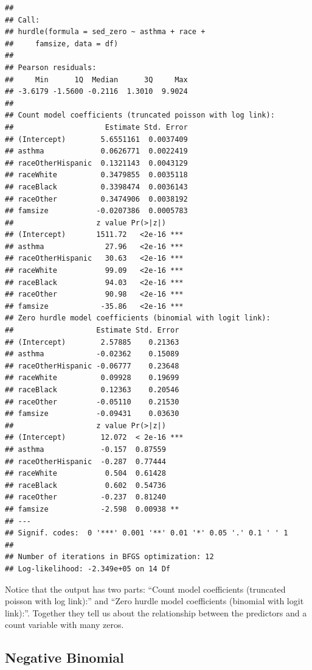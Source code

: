 \documentclass[]{tufte-book}
\theoremstyle{definition}
\theoremstyle{definition}
\theoremstyle{remark}
\begin{document}
\begin{verbatim}
## 
## Call:
## hurdle(formula = sed_zero ~ asthma + race + 
##     famsize, data = df)
## 
## Pearson residuals:
##     Min      1Q  Median      3Q     Max 
## -3.6179 -1.5600 -0.2116  1.3010  9.9024 
## 
## Count model coefficients (truncated poisson with log link):
##                     Estimate Std. Error
## (Intercept)        5.6551161  0.0037409
## asthma             0.0626771  0.0022419
## raceOtherHispanic  0.1321143  0.0043129
## raceWhite          0.3479855  0.0035118
## raceBlack          0.3398474  0.0036143
## raceOther          0.3474906  0.0038192
## famsize           -0.0207386  0.0005783
##                   z value Pr(>|z|)    
## (Intercept)       1511.72   <2e-16 ***
## asthma              27.96   <2e-16 ***
## raceOtherHispanic   30.63   <2e-16 ***
## raceWhite           99.09   <2e-16 ***
## raceBlack           94.03   <2e-16 ***
## raceOther           90.98   <2e-16 ***
## famsize            -35.86   <2e-16 ***
## Zero hurdle model coefficients (binomial with logit link):
##                   Estimate Std. Error
## (Intercept)        2.57885    0.21363
## asthma            -0.02362    0.15089
## raceOtherHispanic -0.06777    0.23648
## raceWhite          0.09928    0.19699
## raceBlack          0.12363    0.20546
## raceOther         -0.05110    0.21530
## famsize           -0.09431    0.03630
##                   z value Pr(>|z|)    
## (Intercept)        12.072  < 2e-16 ***
## asthma             -0.157  0.87559    
## raceOtherHispanic  -0.287  0.77444    
## raceWhite           0.504  0.61428    
## raceBlack           0.602  0.54736    
## raceOther          -0.237  0.81240    
## famsize            -2.598  0.00938 ** 
## ---
## Signif. codes:  0 '***' 0.001 '**' 0.01 '*' 0.05 '.' 0.1 ' ' 1 
## 
## Number of iterations in BFGS optimization: 12 
## Log-likelihood: -2.349e+05 on 14 Df
\end{verbatim}

Notice that the output has two parts: ``Count model coefficients
(truncated poisson with log link):'' and ``Zero hurdle model
coefficients (binomial with logit link):''. Together they tell us about
the relationship between the predictors and a count variable with many
zeros.

\subsection*{Negative Binomial}\label{negative-binomial}
\end{document}
